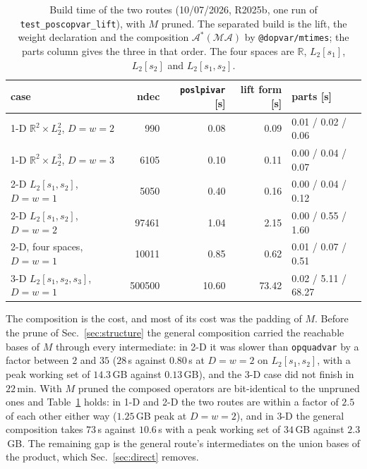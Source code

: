 \documentclass[12pt]{article}
\newcommand{\R}{\mathbb{R}}
\newcommand{\mcl}[1]{\mathcal{#1}}
\newcommand{\code}[1]{\texttt{#1}}
\theoremstyle{plain}
\theoremstyle{definition}
\theoremstyle{remark}
\begin{document}
\begin{table}[h]\centering\footnotesize
\setlength{\tabcolsep}{4pt}
\begin{tabular}{lrrrl}
\toprule
case & ndec & \code{poslpivar} [s] & lift form [s] & parts [s] \\
\midrule
1-D $\R^2\times L_2^2$, $D=w=2$ & 990 & 0.08 & 0.09 & 0.01 / 0.02 / 0.06 \\
1-D $\R^2\times L_2^3$, $D=w=3$ & 6105 & 0.10 & 0.11 & 0.00 / 0.04 / 0.07 \\
2-D $L_2[s_1,s_2]$, $D=w=1$ & 5050 & 0.40 & 0.16 & 0.00 / 0.04 / 0.12 \\
2-D $L_2[s_1,s_2]$, $D=w=2$ & 97461 & 1.04 & 2.15 & 0.00 / 0.55 / 1.60 \\
2-D, four spaces, $D=w=1$ & 10011 & 0.85 & 0.62 & 0.01 / 0.07 / 0.51 \\
3-D $L_2[s_1,s_2,s_3]$, $D=w=1$ & 500500 & 10.60 & 73.42 & 0.02 / 5.11 / 68.27 \\
\bottomrule
\end{tabular}
\caption{Build time of the two routes (10/07/2026, R2025b, one run of \code{test\_poscopvar\_lift}), with $M$ pruned. The separated build is the lift, the weight declaration and the composition $\mcl A^*(\mcl M\mcl A)$ by \code{@dopvar/mtimes}; the parts column gives the three in that order. The four spaces are $\R$, $L_2[s_1]$, $L_2[s_2]$ and $L_2[s_1,s_2]$.}\label{tab:time}
\end{table}

The composition is the cost, and most of its cost was the padding of $M$. Before the prune of Sec.~\ref{sec:structure} the general composition carried the reachable bases of $M$ through every intermediate: in 2-D it was slower than \code{opquadvar} by a factor between $2$ and $35$ ($28$\,s against $0.80$\,s at $D=w=2$ on $L_2[s_1,s_2]$, with a peak working set of $14.3$\,GB against $0.13$\,GB), and the 3-D case did not finish in $22$\,min. With $M$ pruned the composed operators are bit-identical to the unpruned ones and Table~\ref{tab:time} holds: in 1-D and 2-D the two routes are within a factor of $2.5$ of each other either way ($1.25$\,GB peak at $D=w=2$), and in 3-D the general composition takes $73$\,s against $10.6$\,s with a peak working set of $34$\,GB against $2.3$\,GB. The remaining gap is the general route's intermediates on the union bases of the product, which Sec.~\ref{sec:direct} removes.
\end{document}
